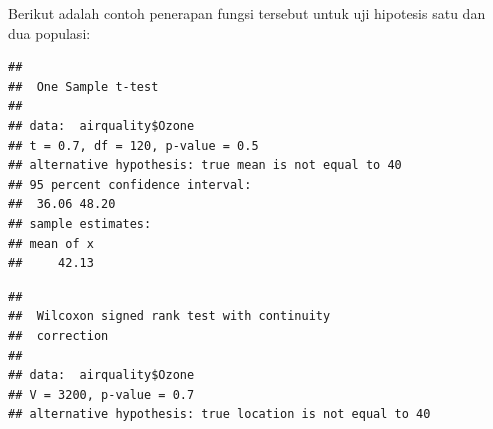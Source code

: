 \documentclass[]{book}
\newenvironment{Shaded}{\begin{snugshade}}{\end{snugshade}}
\newcommand{\CommentTok}[1]{\textcolor[rgb]{0.56,0.35,0.01}{\textit{#1}}}
\newcommand{\DataTypeTok}[1]{\textcolor[rgb]{0.13,0.29,0.53}{#1}}
\newcommand{\DecValTok}[1]{\textcolor[rgb]{0.00,0.00,0.81}{#1}}
\newcommand{\KeywordTok}[1]{\textcolor[rgb]{0.13,0.29,0.53}{\textbf{#1}}}
\newcommand{\NormalTok}[1]{#1}
\newcommand{\OperatorTok}[1]{\textcolor[rgb]{0.81,0.36,0.00}{\textbf{#1}}}
\newcommand{\StringTok}[1]{\textcolor[rgb]{0.31,0.60,0.02}{#1}}
\theoremstyle{definition}
\theoremstyle{definition}
\theoremstyle{definition}
\theoremstyle{remark}
\begin{document}
Berikut adalah contoh penerapan fungsi tersebut untuk uji hipotesis satu dan dua populasi:

\begin{Shaded}
\end{Shaded}

\begin{verbatim}
## 
##  One Sample t-test
## 
## data:  airquality$Ozone
## t = 0.7, df = 120, p-value = 0.5
## alternative hypothesis: true mean is not equal to 40
## 95 percent confidence interval:
##  36.06 48.20
## sample estimates:
## mean of x 
##     42.13
\end{verbatim}

\begin{Shaded}
\end{Shaded}

\begin{verbatim}
## 
##  Wilcoxon signed rank test with continuity
##  correction
## 
## data:  airquality$Ozone
## V = 3200, p-value = 0.7
## alternative hypothesis: true location is not equal to 40
\end{verbatim}
\end{document}
